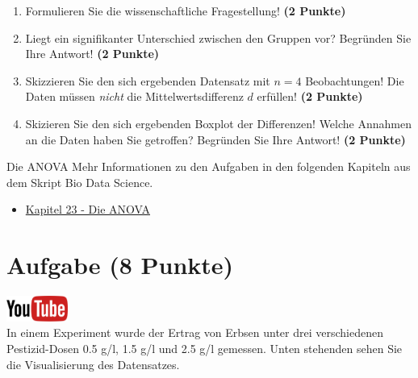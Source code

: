 \documentclass[a4paper, 10pt]{scrartcl}\usepackage[]{graphicx}\usepackage[]{xcolor}
\begin{document}
\begin{enumerate}
  \item Formulieren Sie die wissenschaftliche Fragestellung! \textbf{(2
Punkte)}
\item Liegt ein signifikanter Unterschied zwischen den Gruppen vor?
  Begr{\"u}nden Sie Ihre Antwort! \textbf{(2 Punkte)}
\item Skizzieren Sie den sich ergebenden Datensatz mit $n = 4$
  Beobachtungen! Die Daten m{\"u}ssen \textit{nicht} die Mittelwertsdifferenz
  $d$ erf{\"u}llen! \textbf{(2 Punkte)} 
\item Skizieren Sie den sich ergebenden Boxplot der Differenzen! Welche Annahmen an die Daten haben Sie getroffen? Begr{\"u}nden Sie Ihre Antwort! \textbf{(2 Punkte)} 
\end{enumerate}
 
\clearpage
\begin{graybox}{Die ANOVA}
Mehr Informationen zu den Aufgaben in den folgenden Kapiteln aus dem Skript Bio Data Science.
  \begin{itemize}
  \item \href{https://jkruppa.github.io/stat-tests-anova.html}{Kapitel 23 - Die ANOVA}
  \end{itemize}
\end{graybox}
\clearpage

\section{Aufgabe \hfill (8 Punkte)}

\hfill\href{https://youtu.be/Q7xtQJoOmQI}{\includegraphics[width =
  2cm]{img/youtube}}\\[1Ex]

In einem Experiment wurde der Ertrag von Erbsen unter drei verschiedenen
Pestizid-Dosen 0.5 g/l, 1.5 g/l und 2.5 g/l gemessen. Unten stehenden sehen
Sie die Visualisierung des Datensatzes.
\end{document}
